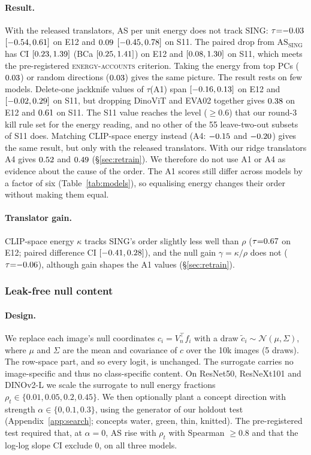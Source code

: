 \documentclass[10pt]{article}
\newcommand{\ASS}{\mathrm{AS}_{\mathrm{SING}}}
\begin{document}
\paragraph{Result.} With the released translators, AS per unit energy does not track SING: $\tau{=}{-0.03}$ $[-0.54,0.61]$ on E12 and $0.09$ $[-0.45,0.78]$ on S11.
The paired drop from $\ASS$ has CI $[0.23,1.39]$ (BCa $[0.25,1.41]$) on E12 and $[0.08,1.30]$ on S11, which meets the pre-registered \textsc{energy-accounts} criterion.
Taking the energy from top PCs ($0.03$) or random directions ($0.03$) gives the same picture.
The result rests on few models.
Delete-one jackknife values of $\tau$(A1) span $[-0.16,0.13]$ on E12 and $[-0.02,0.29]$ on S11, but dropping DinoViT and EVA02 together gives $0.38$ on E12 and $0.61$ on S11. The S11 value reaches the level ($\ge0.6$) that our round-3 kill rule set for the energy reading, and no other of the 55 leave-two-out subsets of S11 does.
Matching CLIP-space energy instead (A4: $-0.15$ and $-0.20$) gives the same result, but only with the released translators. With our ridge translators A4 gives $0.52$ and $0.49$ (\S\ref{sec:retrain}).
We therefore do not use A1 or A4 as evidence about the cause of the order.
The A1 scores still differ across models by a factor of six (Table~\ref{tab:models}), so equalising energy changes their order without making them equal.

\paragraph{Translator gain.}
CLIP-space energy $\kappa$ tracks SING's order slightly less well than $\rho$ ($\tau{=}0.67$ on E12; paired difference CI $[-0.41,0.28]$), and the null gain $\gamma=\kappa/\rho$ does not ($\tau{=}{-0.06}$), although gain shapes the A1 values (\S\ref{sec:retrain}).

\subsubsection{Leak-free null content}
\label{sec:leakfree}
\paragraph{Design.} We replace each image's null coordinates $c_i=V_n^\top f_i$ with a draw $\tilde c_i\sim\mathcal{N}(\mu,\Sigma)$, where $\mu$ and $\Sigma$ are the mean and covariance of $c$ over the 10k images (5 draws).
The row-space part, and so every logit, is unchanged.
The surrogate carries no image-specific and thus no class-specific content.
On ResNet50, ResNeXt101 and DINOv2-L we scale the surrogate to null energy fractions $\rho_t\in\{0.01,0.05,0.2,0.45\}$.
We then optionally plant a concept direction with strength $\alpha\in\{0,0.1,0.3\}$, using the generator of our holdout test (Appendix~\ref{app:search}; concepts water, green, thin, knitted).
The pre-registered test required that, at $\alpha{=}0$, AS rise with $\rho_t$ with Spearman ${\ge}0.8$ and that the log-log slope CI exclude 0, on all three models.
\end{document}
